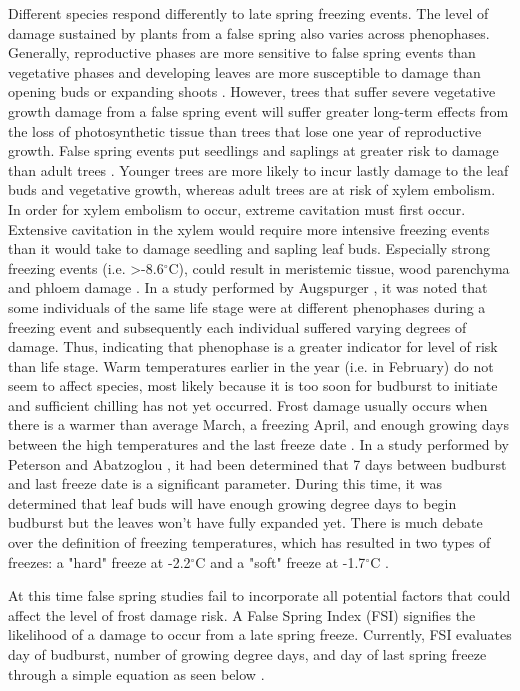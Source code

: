 \documentclass{article}\usepackage[]{graphicx}\usepackage[]{color}
\begin{document}
Different species respond differently to late spring freezing events. The level of damage sustained by plants from a false spring also varies across phenophases. Generally, reproductive phases are more sensitive to false spring events than vegetative phases and developing leaves are more susceptible to damage than opening buds or expanding shoots \citep{Lenz2013,Augspurger2009}. However, trees that suffer severe vegetative growth damage from a false spring event will suffer greater long-term effects from the loss of photosynthetic tissue than trees that lose one year of reproductive growth. False spring events put seedlings and saplings at greater risk to damage than adult trees \citep{Vitasse2014}. Younger trees are more likely to incur lastly damage to the leaf buds and vegetative growth, whereas adult trees are at risk of xylem embolism. In order for xylem embolism to occur, extreme cavitation must first occur. Extensive cavitation in the xylem would require more intensive freezing events than it would take to damage seedling and sapling leaf buds. Especially strong freezing events (i.e. >-8.6$^{\circ}$C), could result in meristemic tissue, wood parenchyma and phloem damage \citep{Lenz2013, Augspurger2011, Sakai1987}. In a study performed by Augspurger \citeyear{Augspurger2009}, it was noted that some individuals of the same life stage were at different phenophases during a freezing event and subsequently each individual suffered varying degrees of damage. Thus, indicating that phenophase is a greater indicator for level of risk than life stage. 
Warm temperatures earlier in the year (i.e. in February) do not seem to affect species, most likely because it is too soon for budburst to initiate and sufficient chilling has not yet occurred. Frost damage usually occurs when there is a warmer than average March, a freezing April, and enough growing days between the high temperatures and the last freeze date \citep{Augspurger2013}. 
In a study performed by Peterson and Abatzoglou \citeyear{Peterson2014}, it had been determined that 7 days between budburst and last freeze date is a significant parameter. During this time, it was determined that leaf buds will have enough growing degree days to begin budburst but the leaves won't have fully expanded yet. There is much debate over the definition of freezing temperatures, which has resulted in two types of freezes: a "hard" freeze at -2.2$^{\circ}$C and a "soft" freeze at -1.7$^{\circ}$C \citep{Augspurger2013, Kodra2011, Vavrus2006}.

At this time false spring studies fail to incorporate all potential factors that could affect the level of frost damage risk. A False Spring Index (FSI) signifies the likelihood of a damage to occur from a late spring freeze. Currently, FSI evaluates day of budburst, number of growing degree days, and day of last spring freeze through a simple equation as seen below \citep{Marino2011}. 
\end{document}
